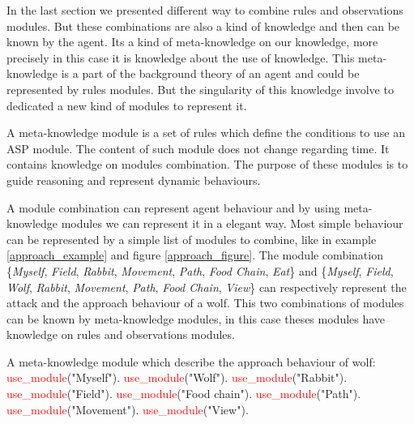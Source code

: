 \documentclass{aamas2012}
\begin{document}
	In the last section we presented different way to combine rules and observations modules.
	But these combinations are also a kind of knowledge and then can be known by the agent.
	Its a kind of meta-knowledge on our knowledge, more precisely in this case it is knowledge about the use of knowledge.
	This meta-knowledge is a part of the background theory of an agent and could be represented by rules modules.
	But the singularity of this knowledge involve to dedicated a new kind of modules to represent it.

	\begin{definition}
		A meta-knowledge module is a set of rules which define the conditions to use an ASP module.
		The content of such module does not change regarding time.
		It contains knowledge on modules combination.	
		The purpose of these modules is to guide reasoning and represent dynamic behaviours.
	\end{definition}
	
	A module combination can represent agent behaviour and by using meta-knowledge modules we can represent it in a elegant way.
	Most simple behaviour can be represented by a simple list of modules to combine, like in example \ref{approach_example} and figure \ref{approach_figure}.
	The module combination \{\textit{Myself}, \textit{Field}, \textit{Rabbit}, \textit{Movement}, \textit{Path}, \textit{Food Chain}, \textit{Eat}\} 
	and \{\textit{Myself}, \textit{Field}, \textit{Wolf}, \textit{Rabbit}, \textit{Movement}, \textit{Path}, \textit{Food Chain}, \textit{View}\} 
	can respectively represent the attack and the approach behaviour of a wolf.
	This two combinations of modules can be known by meta-knowledge modules, in this case theses modules have knowledge on rules and observations modules.
	
	\begin{example}
		\label{approach_example}
		A meta-knowledge module which describe the approach behaviour of wolf:\newline
		\newline
		\textcolor{red}{use\_module}("Myself").\newline
		\textcolor{red}{use\_module}("Wolf").\newline
		\textcolor{red}{use\_module}("Rabbit").\newline
		\textcolor{red}{use\_module}("Field").\newline
		\textcolor{red}{use\_module}("Food chain").\newline
		\textcolor{red}{use\_module}("Path").\newline
		\textcolor{red}{use\_module}("Movement").\newline
		\textcolor{red}{use\_module}("View").
	\end{example}
	
\end{document}
